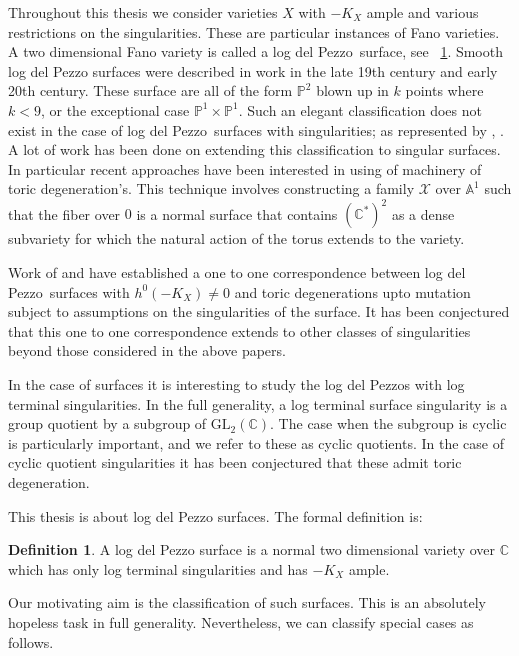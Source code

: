 \documentclass[12pt,a4paper]{book}      %
\theoremstyle{definition}
\newtheorem{dfn}[thm]{Definition}
\newcommand{\C}[1]{(\mathbb{C}^*)^#1}
\newcommand{\ldp}{log del Pezzo}
\newcommand{\mb}[1]{\mathbb{#1}}
\newcommand{\gl}{\text{GL}_2 (\mathbb{C})}
\begin{document}
Throughout this thesis we consider varieties $X$ with $-K_X$ ample and various restrictions on the singularities. These are particular instances of Fano varieties. A two dimensional Fano variety is called a \ldp\ surface, see ~\ref{beginnersdef}. Smooth log del Pezzo surfaces were described in work in the late 19th century and early 20th century. These surface are all of the form $\mb{P}^2$ blown up in $k$ points where $k <9 $, or the exceptional case $\mb{P}^1 \times \mb{P}^1$. Such an elegant classification does not exist in the case of \ldp\ surfaces with singularities; as represented by \cite{CH}, \cite{MR2053462}. A lot of work has been done on extending this classification to singular surfaces. In particular recent approaches have been interested in using of machinery of toric degeneration's. This technique involves constructing a family $\mathcal{X}$ over $\mb{A}^1$ such that the fiber over $0$ is a normal surface that contains $\C{2}$ as a dense subvariety for which the natural action of the torus extends to the variety.  



 Work of \cite{CH} and \cite{AC} have established a one to one correspondence between \ldp\ surfaces with $h^0(-K_X) \neq 0$ and toric degenerations upto mutation subject to assumptions on the singularities of the surface. It has been conjectured that this one to one correspondence extends to other classes of singularities beyond those considered in the above papers. 
 
 
 


In the case of surfaces it is interesting to study the log del Pezzos with log terminal singularities. In the full generality, a log terminal surface singularity is a group quotient by a subgroup of $\gl$. The case when the subgroup is cyclic is particularly important, and we refer to these as cyclic quotients. In the case of cyclic quotient singularities it has been conjectured that these admit toric degeneration.


This thesis is about log del Pezzo surfaces. The formal definition is:
\begin{dfn}\label{beginnersdef}
A log del Pezzo surface is a normal two dimensional variety over $\mb{C}$ which has only log terminal singularities and has $-K_X$ ample.
\end{dfn}


Our motivating aim is the classification of such surfaces.
This is an absolutely hopeless task in full generality.
Nevertheless, we can classify special cases as follows.
\end{document}

